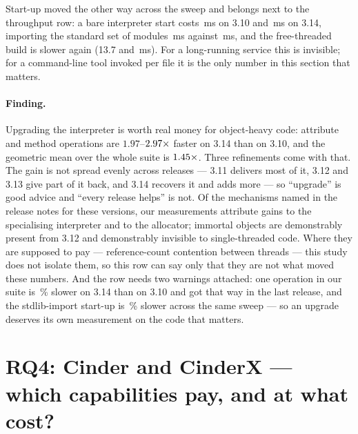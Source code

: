 Start-up moved the other way across the sweep and belongs next to the throughput row: a bare
interpreter start costs \,ms on 3.10 and \,ms on 3.14, importing the standard set of
modules \,ms against \,ms, and the free-threaded build is slower again (13.7 and
\,ms). For a long-running service this is invisible; for a command-line tool invoked per
file it is the only number in this section that matters.

\paragraph{Finding.} Upgrading the interpreter is worth real money for
object-heavy code: attribute and method operations are $1.97$--$\meas{ratio:b3_runtime-v310:attr_set/v310|b3_runtime-v314:attr_set/v314}{2.97}\times$ faster on 3.14 than
on 3.10, and the geometric mean over the whole suite is $\meas{geomean:b3_runtime-v310|b3_runtime-v314}{1.45}\times$. Three refinements come with
that. The gain is not spread evenly across releases --- 3.11 delivers most of it, 3.12 and 3.13
give part of it back, and 3.14 recovers it and adds more --- so ``upgrade'' is good advice and
``every release helps'' is not. Of the mechanisms named in the release notes for these versions, our measurements attribute
gains to the specialising interpreter and to the allocator; immortal objects are demonstrably
present from 3.12 and demonstrably invisible to single-threaded code. Where they are supposed to
pay --- reference-count contention between threads --- this study does not isolate them, so this
row can say only that they are not what moved these numbers. And the row needs two warnings attached: one operation
in our suite is \,\% slower on 3.14 than on 3.10 and got that way in the last release, and
the stdlib-import start-up is \,\% slower across the same sweep --- so an upgrade deserves its
own measurement on the code that matters.

\section{RQ4: Cinder and CinderX --- which capabilities pay, and at what cost?}
\label{sec:rq4}

